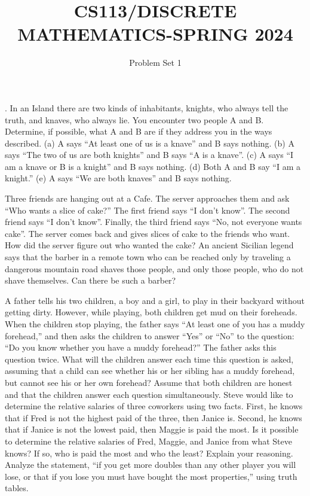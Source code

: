 \documentclass{exam}
\title{CS113/DISCRETE MATHEMATICS-SPRING 2024}
\author{Problem Set 1}
\date{}
\begin{document}
\maketitle



\vspace{5mm}


\begin{questions}


\question . In an Island there are two kinds of inhabitants, knights, who always tell the truth, and knaves, who always lie. You encounter two people A and B. Determine, if possible, what A and B are if they address you in the ways described. 
\newline
(a) A says “At least one of us is a knave” and B says nothing.
\newline
(b) A says “The two of us are both knights” and B says “A is a knave”.
\newline
 (c) A says “I am a knave or B is a knight” and B says nothing. 
 \newline
(d) Both A and B say “I am a knight.”
\newline
 (e) A says “We are both knaves” and B says nothing.



\question Three friends are hanging out at a Cafe. The server approaches them and ask “Who wants a slice of cake?” The first friend says “I don’t know”. The second friend says “I don’t know”. Finally, the third friend says “No, not everyone wants cake”. The server comes back and gives slices of cake to the friends who want. 
\newline
How did the server figure out who wanted the cake?
\question
An ancient Sicilian legend says that the barber in a remote town who can be reached only by traveling a dangerous mountain road shaves those people, and only those people, who do not shave themselves. Can there be such a barber?

\question 
A father tells his two children, a boy and a girl, to play in their backyard without getting dirty. However, while playing, both children get mud on their foreheads. When the children stop playing, the father says “At least one of you has a muddy forehead,” and then asks the children to answer “Yes” or “No” to the question: “Do you know whether you have a muddy forehead?” The father asks this question twice. What will the children answer each time this question is asked, assuming that a child can see whether his or her sibling has a muddy forehead, but cannot see his or her own forehead? Assume that both children are honest and that the children answer each question simultaneously.
\question
Steve would like to determine the relative salaries of three coworkers using two facts. First, he knows that if Fred is not the highest paid of the three, then Janice is. Second, he knows that if Janice is not the lowest paid, then Maggie is paid the most. Is it possible to determine the relative salaries of Fred, Maggie, and Janice from what Steve knows? If so, who is paid the most and who the least? Explain your reasoning.
\question
Analyze the statement, “if you get more doubles than any other player you will lose, or that if you lose you must have bought the most properties,” using truth tables.

\end{questions}
\end{document}
